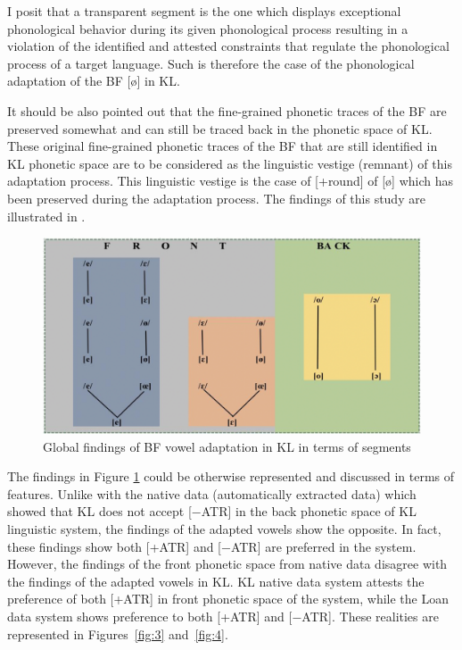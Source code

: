 \documentclass[output=paper]{langscibook}
\begin{document}
I posit that a transparent segment is the one which displays exceptional phonological behavior during its given phonological process resulting in a violation of the identified and attested constraints that regulate the phonological process of a target language. Such is therefore the case of the phonological adaptation of the BF [ø] in KL.

It should be also pointed out that the fine-grained phonetic traces of the BF are preserved somewhat and can still be traced back in the phonetic space of KL. These original fine-grained phonetic traces of the BF that are still identified in KL phonetic space are to be considered as the linguistic vestige (remnant) of this adaptation process. This linguistic vestige is the case of [+round] of [ø] which has been preserved during the adaptation process. The findings of this study are illustrated in .

\begin{figure}
    \includegraphics[width=\textwidth]{figures/kabasele-figure2.png}
    \caption{Global findings of BF vowel adaptation in KL in terms of segments}
    \label{fig:2}
\end{figure}

The findings in Figure \ref{fig:2} could be otherwise represented and discussed in terms of features. Unlike with the native data (automatically extracted data) which showed that KL does not accept [−ATR] in the back phonetic space of KL linguistic system, the findings of the adapted vowels show the opposite. In fact, these findings show both [+ATR] and [−ATR] are preferred in the system. However, the findings of the front phonetic space from native data disagree with the findings of the adapted vowels in KL. KL native data system attests the preference of both [+ATR] in front phonetic space of the system, while the Loan data system shows preference to both [+ATR] and [−ATR]. These realities are represented in Figures~\ref{fig:3} and~\ref{fig:4}.
\end{document}
